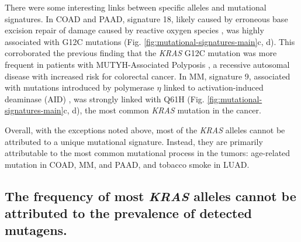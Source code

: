\documentclass[english, 12pt, letterpaper]{article}
\newcommand{\KRAS}{\emph{KRAS}}
\begin{document}
There were some interesting links between specific alleles and mutational signatures.
In COAD and PAAD, signature 18, likely caused by erroneous base excision repair of damage caused by reactive oxygen species \cite{Viel2017, Pilati2017}, was highly associated with G12C mutations (Fig. \ref{fig:mutational-signatures-main}c, d). 
This corroborated the previous finding that the \KRAS{} G12C mutation was more frequent in patients with MUTYH-Associated Polyposis \cite{Viel2017}, a recessive autosomal disease with increased risk for colorectal cancer. 
In MM, signature 9, associated with mutations introduced by polymerase $\eta$ linked to activation-induced deaminase (AID) \cite{Pavri2010Activation-inducedSpt5.}, was strongly linked with Q61H (Fig. \ref{fig:mutational-signatures-main}c, d), the most common \KRAS{} mutation in the cancer.

Overall, with the exceptions noted above, most of the \KRAS{} alleles cannot be attributed to a unique mutational signature. 
Instead, they are primarily attributable to the most common mutational process in the tumors: age-related mutation in COAD, MM, and PAAD, and tobacco smoke in LUAD.


\subsection*{The frequency of most \KRAS{} alleles cannot be attributed to the prevalence of detected mutagens.}
\end{document}
